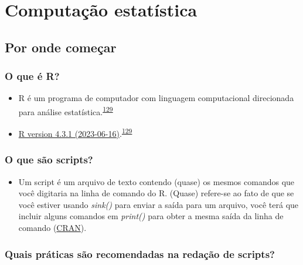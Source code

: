 \documentclass[
]{book}
\providecommand{\tightlist}{%
  \setlength{\itemsep}{0pt}\setlength{\parskip}{0pt}}
\begin{document}
\hypertarget{computacao-estatistica}{%
\chapter{\texorpdfstring{\textbf{Computação estatística}}{Computação estatística}}\label{computacao-estatistica}}

\hypertarget{inicio}{%
\section{Por onde começar}\label{inicio}}

\hypertarget{o-que-uxe9-r}{%
\subsection{O que é R?}\label{o-que-uxe9-r}}

\begin{itemize}
\item
  R é um programa de computador com linguagem computacional direcionada para análise estatística.\textsuperscript{\protect\hyperlink{ref-ihaka1996}{129}}
\item
  \href{https://cran.rstudio.com/}{R version 4.3.1 (2023-06-16)}.\textsuperscript{\protect\hyperlink{ref-ihaka1996}{129}}
\end{itemize}

\hypertarget{o-que-suxe3o-scripts}{%
\subsection{O que são scripts?}\label{o-que-suxe3o-scripts}}

\begin{itemize}
\tightlist
\item
  Um script é um arquivo de texto contendo (quase) os mesmos comandos que você digitaria na linha de comando do R. (Quase) refere-se ao fato de que se você estiver usando \emph{sink()} para enviar a saída para um arquivo, você terá que incluir alguns comandos em \emph{print()} para obter a mesma saída da linha de comando (\href{https://cran.r-project.org/doc/contrib/Lemon-kickstart/kr_scrpt.html}{CRAN}).
\end{itemize}

\hypertarget{quais-pruxe1ticas-suxe3o-recomendadas-na-redauxe7uxe3o-de-scripts}{%
\subsection{Quais práticas são recomendadas na redação de scripts?}\label{quais-pruxe1ticas-suxe3o-recomendadas-na-redauxe7uxe3o-de-scripts}}
\end{document}
